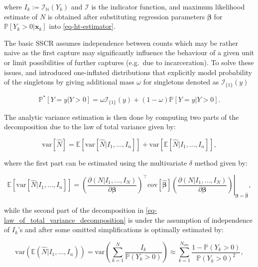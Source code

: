 \documentclass[
]{jss}
\newcommand{\1}{\mathcal{I}} \newcommand{\bZero}{\boldsymbol{0}}
\begin{document}
where \(I_{k}:=\mathcal{I}_{\mathbb{N}}(Y_{k})\) and \(\mathcal{I}\) is
the indicator function, and maximum likelihood estimate of \(N\) is
obtained after substituting regression parameters \(\boldsymbol{\beta}\)
for \(\mathbb{P}[Y_{k}>0|\boldsymbol{x}_{k}]\) into
\eqref{eq-ht-estimator}.

The basic SSCR assumes independence between counts which may be rather
naive as the first capture may significantly influence the behaviour of
a given unit or limit possibilities of further captures (e.g.~due to
incarceration). To solve these issues, \citet{godwin2017estimation} and
\citet{ztoi-oizt-poisson} introduced one-inflated distributions that
explicitly model probability of the singletons by giving additional mass
\(\omega\) for singletons denoted as \(\mathcal{I}_{\{1\}}(y)\)
\citep[cf.][]{bohning2024one}

\begin{equation*}
  \mathbb{P}^{\ast}[Y=y|Y>0] =
  \omega\mathcal{I}_{\{1\}}(y)+(1-\omega)\mathbb{P}[Y=y|Y>0].
\end{equation*}

The analytic variance estimation is then done by computing two parts of
the decomposition due to the law of total variance given by:

\begin{equation}\label{eq-law_of_total_variance_decomposition}
  \text{var}[\hat{N}] = \mathbb{E}\left[\text{var}
  \left[\hat{N}|I_{1},\dots,I_{n}\right]\right] + 
  \text{var}\left[\mathbb{E}[\hat{N}|I_{1},\dots,I_{n}]\right],
\end{equation}

where the first part can be estimated using the multivariate \(\delta\)
method given by:

\begin{equation*}
  \mathbb{E}\left[\text{var} \left[\hat{N}|I_{1},\dots,I_{n}\right]\right] =
  \left.\left(\frac{\partial(N|I_1,\dots,I_N)}{\partial\boldsymbol{\beta}}\right)^\top
  \text{cov}\left[\hat{\boldsymbol{\beta}}\right]
  \left(\frac{\partial(N|I_1,\dots,I_N)}{\partial\boldsymbol{\beta}}\right)
  \right|_{\boldsymbol{\beta}=\hat{\boldsymbol{\beta}}},
\end{equation*}

while the second part of the decomposition in
\eqref{eq-law_of_total_variance_decomposition} is under the assumption
of independence of \(I_{k}\)'s and after some omitted simplifications is
optimally estimated by:

\begin{equation*}
  \text{var}\left(\mathbb{E}(\hat{N}|I_{1},\dots,I_{n})\right) =
  \text{var}\left(\sum_{k=1}^{N}\frac{I_{k}}{\mathbb{P}(Y_{k}>0)}\right)
  \approx\sum_{k=1}^{N_{obs}}\frac{1-\mathbb{P}(Y_{k}>0)}{\mathbb{P}(Y_{k}>0)^{2}},
\end{equation*}
\end{document}
